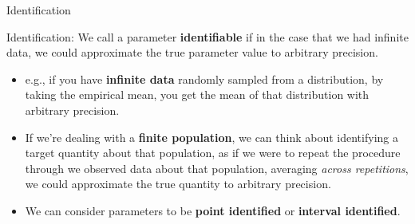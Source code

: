 \documentclass[xcolor={dvipsnames},handout]{beamer}
\begin{document}

\begin{frame}{Identification}

\begin{wideitemize}
\item Identification: We call a parameter \textbf{identifiable} if in the case that we had infinite data, we could approximate the true parameter value to arbitrary precision. \pause
\begin{itemize}
\item e.g., if you have \textbf{infinite data} randomly sampled from a distribution, by taking the empirical mean, you get the mean of that distribution with arbitrary precision.\pause
\item If we're dealing with a \textbf{finite population}, we can think about identifying a target quantity about that population, as if we were to repeat the procedure through we observed data about that population, averaging \textit{across repetitions}, we could approximate the true quantity to arbitrary precision.\pause
\item We can consider parameters to be \textbf{point identified} or \textbf{interval identified}. 
\end{itemize}
\end{wideitemize}

\end{frame}


\end{document}
